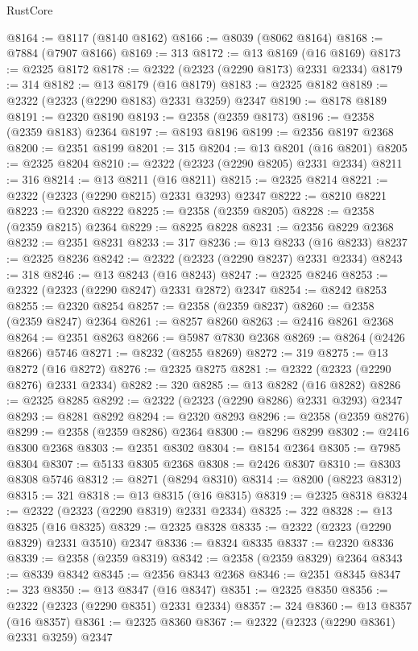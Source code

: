 \begin{lexlean}{RustCore}
\begin{coremodule}
@8164 := @8117 (@8140 @8162)
@8166 := @8039 (@8062 @8164)
@8168 := @7884 (@7907 @8166)
@8169 := 313
@8172 := @13 @8169 (@16 @8169)
@8173 := @2325 @8172
@8178 := @2322 (@2323 (@2290 @8173) @2331 @2334)
@8179 := 314
@8182 := @13 @8179 (@16 @8179)
@8183 := @2325 @8182
@8189 := @2322 (@2323 (@2290 @8183) @2331 @3259) @2347
@8190 := @8178 @8189
@8191 := @2320 @8190
@8193 := @2358 (@2359 @8173)
@8196 := @2358 (@2359 @8183) @2364
@8197 := @8193 @8196
@8199 := @2356 @8197 @2368
@8200 := @2351 @8199
@8201 := 315
@8204 := @13 @8201 (@16 @8201)
@8205 := @2325 @8204
@8210 := @2322 (@2323 (@2290 @8205) @2331 @2334)
@8211 := 316
@8214 := @13 @8211 (@16 @8211)
@8215 := @2325 @8214
@8221 := @2322 (@2323 (@2290 @8215) @2331 @3293) @2347
@8222 := @8210 @8221
@8223 := @2320 @8222
@8225 := @2358 (@2359 @8205)
@8228 := @2358 (@2359 @8215) @2364
@8229 := @8225 @8228
@8231 := @2356 @8229 @2368
@8232 := @2351 @8231
@8233 := 317
@8236 := @13 @8233 (@16 @8233)
@8237 := @2325 @8236
@8242 := @2322 (@2323 (@2290 @8237) @2331 @2334)
@8243 := 318
@8246 := @13 @8243 (@16 @8243)
@8247 := @2325 @8246
@8253 := @2322 (@2323 (@2290 @8247) @2331 @2872) @2347
@8254 := @8242 @8253
@8255 := @2320 @8254
@8257 := @2358 (@2359 @8237)
@8260 := @2358 (@2359 @8247) @2364
@8261 := @8257 @8260
@8263 := @2416 @8261 @2368
@8264 := @2351 @8263
@8266 := @5987 @7830 @2368
@8269 := @8264 (@2426 @8266) @5746
@8271 := @8232 (@8255 @8269)
@8272 := 319
@8275 := @13 @8272 (@16 @8272)
@8276 := @2325 @8275
@8281 := @2322 (@2323 (@2290 @8276) @2331 @2334)
@8282 := 320
@8285 := @13 @8282 (@16 @8282)
@8286 := @2325 @8285
@8292 := @2322 (@2323 (@2290 @8286) @2331 @3293) @2347
@8293 := @8281 @8292
@8294 := @2320 @8293
@8296 := @2358 (@2359 @8276)
@8299 := @2358 (@2359 @8286) @2364
@8300 := @8296 @8299
@8302 := @2416 @8300 @2368
@8303 := @2351 @8302
@8304 := @8154 @2364
@8305 := @7985 @8304
@8307 := @5133 @8305 @2368
@8308 := @2426 @8307
@8310 := @8303 @8308 @5746
@8312 := @8271 (@8294 @8310)
@8314 := @8200 (@8223 @8312)
@8315 := 321
@8318 := @13 @8315 (@16 @8315)
@8319 := @2325 @8318
@8324 := @2322 (@2323 (@2290 @8319) @2331 @2334)
@8325 := 322
@8328 := @13 @8325 (@16 @8325)
@8329 := @2325 @8328
@8335 := @2322 (@2323 (@2290 @8329) @2331 @3510) @2347
@8336 := @8324 @8335
@8337 := @2320 @8336
@8339 := @2358 (@2359 @8319)
@8342 := @2358 (@2359 @8329) @2364
@8343 := @8339 @8342
@8345 := @2356 @8343 @2368
@8346 := @2351 @8345
@8347 := 323
@8350 := @13 @8347 (@16 @8347)
@8351 := @2325 @8350
@8356 := @2322 (@2323 (@2290 @8351) @2331 @2334)
@8357 := 324
@8360 := @13 @8357 (@16 @8357)
@8361 := @2325 @8360
@8367 := @2322 (@2323 (@2290 @8361) @2331 @3259) @2347

\end{coremodule}
\end{lexlean}
